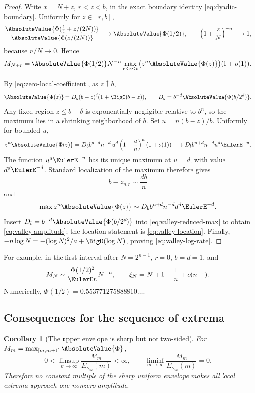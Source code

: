 \documentclass[11pt,oneside]{article}
\newtheorem{corollary}[corollary]{Corollary}
\theoremstyle{definition}
\theoremstyle{remark}
\newcommand{\Phiup}{\Phi}
\begin{document}
\begin{proof}
Write $x=N+z$, $r<z<b$, in the exact boundary identity
\eqref{eq:dyadic-boundary}.  Uniformly for $z\in[r,b]$,
\begin{equation}
 \frac{\AbsoluteValue{\Phiup(\tfrac12+z/(2N))}}
      {\AbsoluteValue{\Phiup(z/(2N))}}
 \longrightarrow\AbsoluteValue{\Phiup(1/2)},
 \qquad
 \left(1+\frac zN\right)^{-n}\longrightarrow1,
 \label{eq:valley-uniform-factors}
\end{equation}
because $n/N\to0$.  Hence
\begin{equation}
 M_{N+r}
 =\AbsoluteValue{\Phiup(1/2)}N^{-n}
   \max_{r\le z\le b}\bigl(z^n\AbsoluteValue{\Phiup(z)}\bigr)(1+o(1)).
 \label{eq:valley-reduced-max}
\end{equation}

By \eqref{eq:zero-local-coefficient}, as $z\uparrow b$,
\[
 \AbsoluteValue{\Phiup(z)}
 =D_b(b-z)^d(1+\BigO(b-z)),
 \qquad
 D_b=b^{-d}\AbsoluteValue{\Phiup(b/2^d)}.
\]
Any fixed region $z\le b-\delta$ is exponentially negligible relative to $b^n$, so the
maximum lies in a shrinking neighborhood of $b$.  Set
$u=n(b-z)/b$.  Uniformly for bounded $u$,
\[
 z^n\AbsoluteValue{\Phiup(z)}
 =D_b b^{n+d}n^{-d}\,u^d\left(1-\frac un\right)^n(1+o(1))
 \longrightarrow
 D_b b^{n+d}n^{-d}u^d\EulerE^{-u}.
\]
The function $u^d\EulerE^{-u}$ has its unique maximum at $u=d$, with value $d^d\EulerE^{-d}$.
Standard localization of the maximum therefore gives
\[
 b-z_{n,r}\sim\frac{db}{n}
\]
and
\[
 \max z^n\AbsoluteValue{\Phiup(z)}
 \sim D_b b^{n+d}n^{-d}d^d\EulerE^{-d}.
\]
Insert $D_b=b^{-d}\AbsoluteValue{\Phiup(b/2^d)}$ into
\eqref{eq:valley-reduced-max} to obtain \eqref{eq:valley-amplitude}; the location statement
is \eqref{eq:valley-location}.  Finally,
$-n\log N=-(\log N)^2/a+\BigO(\log N)$, proving
\eqref{eq:valley-log-rate}.
\end{proof}

For example, in the first interval after $N=2^{n-1}$, $r=0$, $b=d=1$, and
\begin{equation}
 M_N\sim\frac{\Phiup(1/2)^2}{\EulerE n}N^{-n},
 \qquad
 \xi_N=N+1-\frac1n+o(n^{-1}).
 \label{eq:first-dyadic-valley}
\end{equation}
Numerically,
$\Phiup(1/2)=0.553771275888810\ldots$.

\subsection{Consequences for the sequence of extrema}

\begin{corollary}[The upper envelope is sharp but not two-sided]
\label{cor:extrema-limsup-liminf}
For $M_m=\max_{[m,m+1]}\AbsoluteValue{\Phiup}$,
\begin{equation}
 0<\limsup_{m\to\infty}\frac{M_m}{E_{\kappa_\infty}(m)}<\infty,
 \qquad
 \liminf_{m\to\infty}\frac{M_m}{E_{\kappa_\infty}(m)}=0.
 \label{eq:extrema-limsup-liminf}
\end{equation}
Therefore no constant multiple of the sharp uniform envelope makes all local extrema
approach one nonzero amplitude.
\end{corollary}
\end{document}
